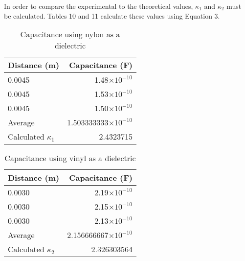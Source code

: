 \documentclass [12pt, letterpaper, twoside] {article}
\begin{document}
\begin{enumerate}
  In order to compare the experimental to the theoretical values, \(\kappa_{1}\) and \(\kappa_{2}\) must be calculated. Tables 10 and 11 calculate these values using Equation 3. 

  \begin{table}[h!]
    \centering
    \begin{tabular}{| l | r |}
      \hline\hline
      Distance (m) & Capacitance (F) \\
      \hline
      0.0045 & 1.48\(\times10^{-10}\) \\
      \hline
      0.0045 & 1.53\(\times10^{-10}\) \\
      \hline
      0.0045 & 1.50\(\times10^{-10}\) \\
      \hline
      Average & 1.503333333\(\times10^{-10}\) \\
      \hline
      Calculated \(\kappa_{1}\) & 2.4323715 \\
      \hline\hline
    \end{tabular}
    \caption{Capacitance using nylon as a dielectric}
  \end{table}

  \begin{table}[h!]
    \centering
    \begin{tabular}{| l | r |}
      \hline\hline
      Distance (m) & Capacitance (F) \\
      \hline
      0.0030 & 2.19\(\times10^{-10}\) \\
      \hline
      0.0030 & 2.15\(\times10^{-10}\) \\
      \hline
      0.0030 & 2.13\(\times10^{-10}\) \\
      \hline
      Average & 2.156666667\(\times10^{-10}\) \\
      \hline
      Calculated \(\kappa_{2}\) & 2.326303564 \\
      \hline\hline
    \end{tabular}
    \caption{Capacitance using vinyl as a dielectric}
  \end{table}


\end{enumerate}
\end{document}
